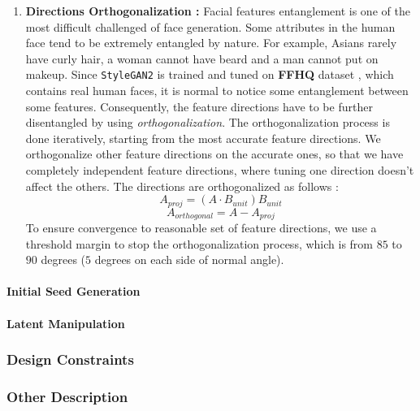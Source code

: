 \begin{enumerate}
    \item \textbf{Directions Orthogonalization :} Facial features entanglement is one of the most difficult challenged of face generation. Some attributes in the human face tend to be extremely entangled by nature. For example, Asians rarely have curly hair, a woman cannot have beard and a man cannot put on makeup. Since \texttt{StyleGAN2} is trained and tuned on \textbf{FFHQ} dataset \cite{karras2019stylebased}, which contains real human faces, it is normal to notice some entanglement between some features. Consequently, the feature directions have to be further disentangled by using \emph{orthogonalization}. The orthogonalization process is done iteratively, starting from the most accurate feature directions. We orthogonalize other feature directions on the accurate ones, so that we have completely independent feature directions, where tuning one direction doesn't affect the others. The directions are orthogonalized as follows :
    \begin{equation}
        A_{proj} = (A \cdot B_{unit}) B_{unit}
    \end{equation}
    \begin{equation}
        A_{orthogonal} = A - A_{proj}
    \end{equation}
    To ensure convergence to reasonable set of feature directions, we use a threshold margin to stop the orthogonalization process, which is from $85$ to $90$ degrees ($5$ degrees on each side of normal angle).
\end{enumerate}

\paragraph{Initial Seed Generation}

\paragraph{Latent Manipulation}

\subsubsection{Design Constraints}

\subsubsection{Other Description}
